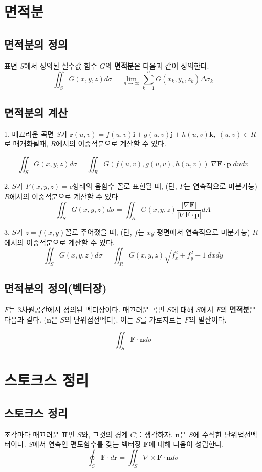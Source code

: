 \documentclass[chapter, oneside]{oblivoir}
\newcommand{\term}[1]{\textbf{#1}}
\begin{document}
\section{면적분}
\subsection{면적분의 정의}
표면 $S$에서 정의된 실수값 함수 $G$의 \term{면적분}은 다음과 같이 정의한다.
$$ \iint_S G(x,y,z) d\sigma = \lim_{n \to \infty}\sum_{k=1}^{n} G(x_k , y_k , z_k ) \Delta \sigma_k $$
\subsection{면적분의 계산}
1. 매끄러운 곡면 $S$가 $\textbf{r}(u,v) = f(u,v)\textbf{i}+g(u,v)\textbf{j}+h(u,v)\textbf{k},\ (u,v) \in R$로 매개화될때, $R$에서의 이중적분으로 계산할 수 있다.

$$ \iint_S G(x,y,z) d\sigma = \iint_R G(f(u,v), g(u,v), h(u,v)) \left| \nabla \textbf{F} \cdot \textbf{p} \right| du dv $$

2. $S$가 $F(x,y,z)=c$형태의 음함수 꼴로 표현될 때, (단, $F$는 연속적으로 미분가능) $R$에서의 이중적분으로 계산할 수 있다.
$$ \iint_S G(x,y,z) d\sigma = \iint_R G(x,y,z) \frac{\left| \nabla \textbf{F} \right|}{\left| \nabla \textbf{F} \cdot \textbf{p} \right|} dA $$

3. $S$가 $z=f(x,y)$꼴로 주어졌을 때, (단, $f$는 $xy$-평면에서 연속적으로 미분가능)  $R$에서의 이중적분으로 계산할 수 있다.
$$ \iint_S G(x,y,z) d\sigma = \iint_R G(x,y,z) \sqrt{f_x^2 + f_y^2 + 1} \ dx dy $$

\subsection{면적분의 정의(벡터장)}
$F$는 3차원공간에서 정의된 벡터장이다. 매끄러운 곡면 $S$에 대해 $S$에서 $F$의 \term{면적분}은 다음과 같다. ($\textbf{n}$은 $S$의 단위접선벡터). 이는 $S$를 가로지르는 $F$의 발산이다.

$$ \iint_S \textbf{F} \cdot \textbf{n} d\sigma$$


\section{스토크스 정리}
\subsection{스토크스 정리}
조각마다 매끄러운 표면 $S$와, 그것의 경계 $C$를 생각하자. $\textbf{n}$은 $S$에 수직한 단위법선벡터이다. $S$에서 연속인 편도함수를 갖는 벡터장 $\textbf{F}$에 대해 다음이 성립한다.
$$\oint_C \textbf{F} \cdot d\textbf{r} = \iint_S \nabla \times \textbf{F} \cdot \textbf{n} d\sigma $$
\end{document}
